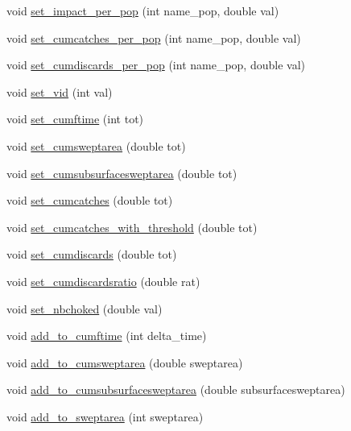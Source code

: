 \begin{DoxyCompactItemize}
\item 
void \mbox{\hyperlink{class_node_a992b667666ced642a56f44a66a5192ed}{set\+\_\+impact\+\_\+per\+\_\+pop}} (int name\+\_\+pop, double val)
\item 
void \mbox{\hyperlink{class_node_a53290d133db3200cc9eb1b78ada8c29c}{set\+\_\+cumcatches\+\_\+per\+\_\+pop}} (int name\+\_\+pop, double val)
\item 
void \mbox{\hyperlink{class_node_acc09d3b35e8aa727151ba8fd1c92e5cb}{set\+\_\+cumdiscards\+\_\+per\+\_\+pop}} (int name\+\_\+pop, double val)
\item 
void \mbox{\hyperlink{class_node_a87ebb1122c0ba7806446668c66eae287}{set\+\_\+vid}} (int val)
\item 
void \mbox{\hyperlink{class_node_a01ecdcd5b872aa2cd73279797813f581}{set\+\_\+cumftime}} (int tot)
\item 
void \mbox{\hyperlink{class_node_a9ad4d972466f00f732804a5d32a9a27d}{set\+\_\+cumsweptarea}} (double tot)
\item 
void \mbox{\hyperlink{class_node_a94f17bf88b89fc9abc1cc1b8345d7734}{set\+\_\+cumsubsurfacesweptarea}} (double tot)
\item 
void \mbox{\hyperlink{class_node_a57005e3aab9ea6e722c2c671d5944b70}{set\+\_\+cumcatches}} (double tot)
\item 
void \mbox{\hyperlink{class_node_a7ec46867ce2300b32fe3014c03972f2c}{set\+\_\+cumcatches\+\_\+with\+\_\+threshold}} (double tot)
\item 
void \mbox{\hyperlink{class_node_a1058db59be640d33c158914115fac8f3}{set\+\_\+cumdiscards}} (double tot)
\item 
void \mbox{\hyperlink{class_node_ae1789d3b6f956340ed3777abf0c97b22}{set\+\_\+cumdiscardsratio}} (double rat)
\item 
void \mbox{\hyperlink{class_node_a1de91a018aee7f94b1bf948ec86cfaf0}{set\+\_\+nbchoked}} (double val)
\item 
void \mbox{\hyperlink{class_node_af9f57c027b75b98740ebd4953229b5a8}{add\+\_\+to\+\_\+cumftime}} (int delta\+\_\+time)
\item 
void \mbox{\hyperlink{class_node_a9d092fe950d7edbcf378ee0593a49535}{add\+\_\+to\+\_\+cumsweptarea}} (double sweptarea)
\item 
void \mbox{\hyperlink{class_node_a65969247b42121fb3e6ae0ebadcec6c7}{add\+\_\+to\+\_\+cumsubsurfacesweptarea}} (double subsurfacesweptarea)
\item 
void \mbox{\hyperlink{class_node_aae298a7cb5a230092a2f8d8c699c8e1d}{add\+\_\+to\+\_\+sweptarea}} (int sweptarea)

\end{DoxyCompactItemize}
